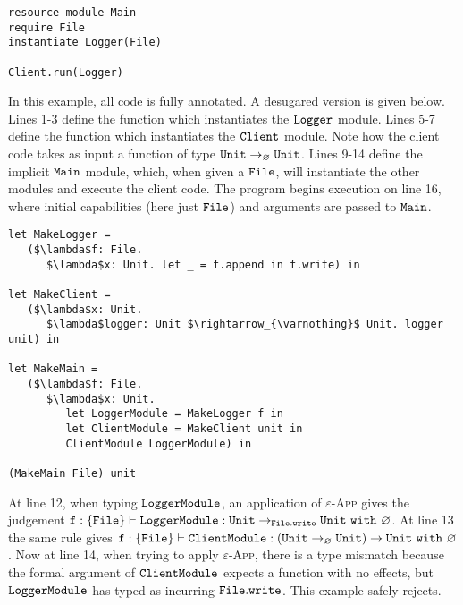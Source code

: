 \begin{lstlisting}
resource module Main
require File
instantiate Logger(File)

Client.run(Logger)
\end{lstlisting}

In this example, all code is fully annotated. A desugared version is given below. Lines 1-3 define the function which instantiates the $\mathtt{Logger}$ module. Lines 5-7 define the function which instantiates the $\mathtt{Client}$ module. Note how the client code takes as input a function of type $\mathtt{Unit} \rightarrow_{\varnothing} \mathtt{Unit}$. Lines 9-14 define the implicit $\mathtt{Main}$ module, which, when given a $\mathtt{File}$, will instantiate the other modules and execute the client code. The program begins execution on line 16, where initial capabilities (here just $\mathtt{File}$) and arguments are passed to $\mathtt{Main}$.

\begin{lstlisting}
let MakeLogger =
   ($\lambda$f: File.
      $\lambda$x: Unit. let _ = f.append in f.write) in
           
let MakeClient =
   ($\lambda$x: Unit.
      $\lambda$logger: Unit $\rightarrow_{\varnothing}$ Unit. logger unit) in
                  
let MakeMain =
   ($\lambda$f: File.
      $\lambda$x: Unit.
         let LoggerModule = MakeLogger f in
         let ClientModule = MakeClient unit in
         ClientModule LoggerModule) in

(MakeMain File) unit
\end{lstlisting}

At line 12, when typing $\mathtt{LoggerModule}$, an application of \textsc{$\varepsilon$-App} gives the judgement $\mathtt{ f: \{ File \} \vdash LoggerModule: Unit \rightarrow_{\mathtt{File.write}} Unit~\mathtt{with}~ \varnothing}$. At line 13 the same rule gives $\mathtt{ f: \{ File \} \vdash ClientModule: (Unit \rightarrow_{\varnothing} Unit) \rightarrow Unit~\mathtt{with}~ \varnothing}$. Now at line 14, when trying to apply \textsc{$\varepsilon$-App}, there is a type mismatch because the formal argument of $\mathtt{ClientModule}$ expects a function with no effects, but $\mathtt{LoggerModule}$ has typed as incurring $\mathtt{File.write}$. This example safely rejects.









































